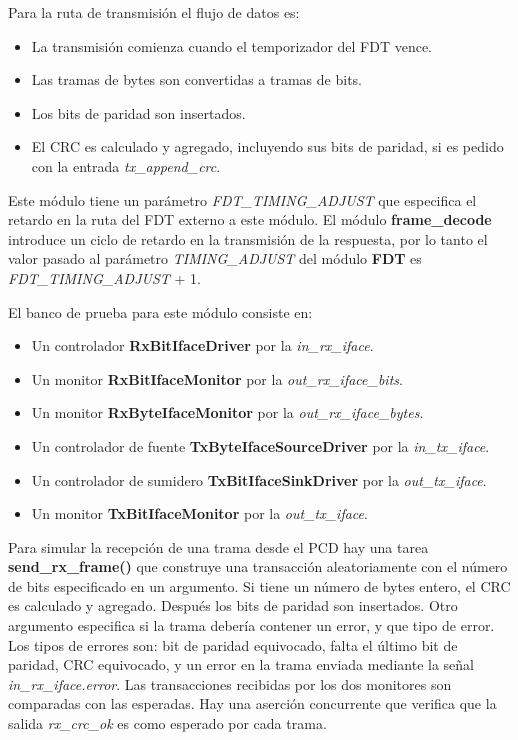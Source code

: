 \documentclass[a4paper, twoside, 11pt]{report}
\begin{document}
Para la ruta de transmisión el flujo de datos es:

\begin{itemize}
  \item La transmisión comienza cuando el temporizador del FDT vence.
  \item Las tramas de bytes son convertidas a tramas de bits.
  \item Los bits de paridad son insertados.
  \item El CRC es calculado y agregado, incluyendo sus bits de paridad, si es pedido con la entrada \textit{tx\_append\_crc}.
\end{itemize}

Este módulo tiene un parámetro \textit{FDT\_TIMING\_ADJUST} que especifica el retardo en la ruta del FDT externo a este módulo. El módulo \textbf{frame\_decode} introduce un ciclo de retardo en la transmisión de la respuesta, por lo tanto el valor pasado al parámetro \textit{TIMING\_ADJUST} del módulo \textbf{FDT} es \textit{FDT\_TIMING\_ADJUST} + 1.

El banco de prueba para este módulo consiste en:

\begin{itemize}
  \item Un controlador \textbf{RxBitIfaceDriver} por la \textit{in\_rx\_iface}.
  \item Un monitor \textbf{RxBitIfaceMonitor} por la \textit{out\_rx\_iface\_bits}.
  \item Un monitor \textbf{RxByteIfaceMonitor} por la \textit{out\_rx\_iface\_bytes}.
  \item Un controlador de fuente \textbf{TxByteIfaceSourceDriver} por la \textit{in\_tx\_iface}.
  \item Un controlador de sumidero \textbf{TxBitIfaceSinkDriver} por la \textit{out\_tx\_iface}.
  \item Un monitor \textbf{TxBitIfaceMonitor} por la \textit{out\_tx\_iface}.
\end{itemize}

Para simular la recepción de una trama desde el PCD hay una tarea \textbf{send\_rx\_frame()} que construye una transacción aleatoriamente con el número de bits especificado en un argumento. Si tiene un número de bytes entero, el CRC es calculado y agregado. Después los bits de paridad son insertados. Otro argumento especifica si la trama debería contener un error, y que tipo de error. Los tipos de errores son: bit de paridad equivocado, falta el último bit de paridad, CRC equivocado, y un error en la trama enviada mediante la señal \textit{in\_rx\_iface.error}. Las transacciones recibidas por los dos monitores son comparadas con las esperadas. Hay una aserción concurrente que verifica que la salida \textit{rx\_crc\_ok} es como esperado por cada trama.
\end{document}
